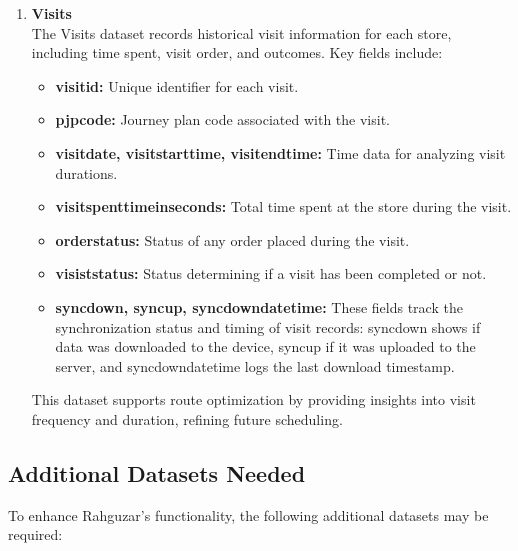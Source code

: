 \begin{enumerate}
\item \textbf{Visits} \\
The Visits dataset records historical visit information for each store, including time spent, visit order, and outcomes. Key fields include:
    \begin{itemize}
        \item \textbf{visitid:} Unique identifier for each visit.
        \item \textbf{pjpcode:} Journey plan code associated with the visit.
        \item \textbf{visitdate, visitstarttime, visitendtime:} Time data for analyzing visit durations.
        \item \textbf{visitspenttimeinseconds:} Total time spent at the store during the visit.
        \item \textbf{orderstatus:} Status of any order placed during the visit.
        \item \textbf{visiststatus: } Status determining if a visit has been completed or not.
        \item \textbf{syncdown, syncup, syncdowndatetime: } These fields track the synchronization status and timing of visit records: syncdown shows if data was downloaded to the device, syncup if it was uploaded to the server, and syncdowndatetime logs the last download timestamp.
    \end{itemize}
This dataset supports route optimization by providing insights into visit frequency and duration, refining future scheduling.

\end{enumerate}

\subsection*{Additional Datasets Needed}

To enhance Rahguzar's functionality, the following additional datasets may be required:

